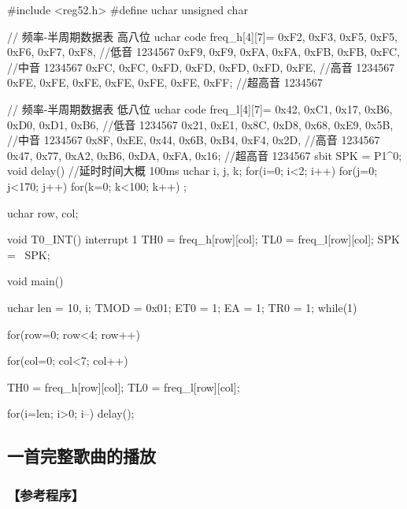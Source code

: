 \documentclass{swfulabreport}
\begin{document}
\begin{ccode}
#include <reg52.h>
#define uchar unsigned char

// 频率-半周期数据表 高八位
uchar code freq_h[4][7]={
   {0xF2, 0xF3, 0xF5, 0xF5, 0xF6, 0xF7, 0xF8},  //低音 1234567
   {0xF9, 0xF9, 0xFA, 0xFA, 0xFB, 0xFB, 0xFC},  //中音 1234567
   {0xFC, 0xFC, 0xFD, 0xFD, 0xFD, 0xFD, 0xFE},  //高音 1234567
   {0xFE, 0xFE, 0xFE, 0xFE, 0xFE, 0xFE, 0xFF}}; //超高音 1234567

// 频率-半周期数据表 低八位
uchar code freq_l[4][7]={
   {0x42, 0xC1, 0x17, 0xB6, 0xD0, 0xD1, 0xB6},  //低音 1234567
   {0x21, 0xE1, 0x8C, 0xD8, 0x68, 0xE9, 0x5B},  //中音 1234567
   {0x8F, 0xEE, 0x44, 0x6B, 0xB4, 0xF4, 0x2D},  //高音 1234567
   {0x47, 0x77, 0xA2, 0xB6, 0xDA, 0xFA, 0x16}}; //超高音 1234567
sbit SPK = P1^0;
void delay() //延时时间大概 100ms
{
   uchar i, j, k;
   for(i=0; i<2; i++)
   {
      for(j=0; j<170; j++)
      {
         for(k=0; k<100; k++)
         {
            ;
         }
      }
   }
}

uchar row, col;

void T0_INT() interrupt 1
{
   TH0 = freq_h[row][col];
   TL0 = freq_l[row][col];
   SPK = ~SPK;
}

void main()
{
   uchar len = 10, i;
   TMOD = 0x01;
   ET0 = 1;
   EA = 1;
   TR0 = 1;
   while(1)
   {
      for(row=0; row<4; row++)
      {
         for(col=0; col<7; col++)
         {
            TH0 = freq_h[row][col];
            TL0 = freq_l[row][col];

            for(i=len; i>0; i--)
            {
                delay();
            }
         }
      }
   }
}
\end{ccode}


\subsection{一首完整歌曲的播放}

\subsubsection{【参考程序】}
\end{document}
